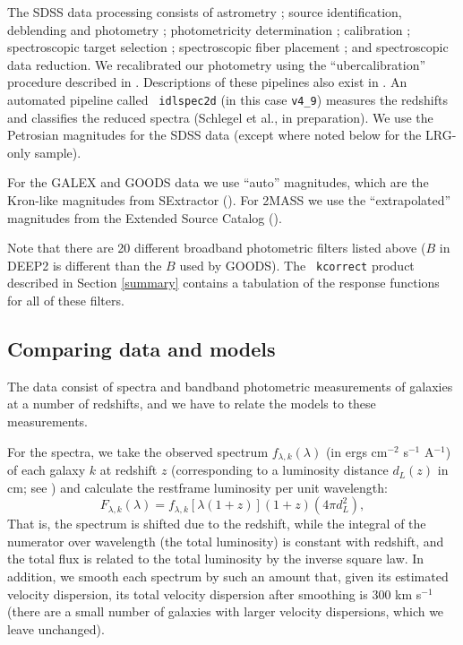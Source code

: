 \documentclass[10pt,preprint]{aastex}
\renewcommand{\AA}{A}
\begin{document}
The SDSS data processing consists of astrometry \citep{pier03a};
source identification, deblending and photometry \citep{lupton01a};
photometricity determination \citep{hogg01a}; calibration
\citep{fukugita96a,smith02a}; spectroscopic target selection
\citep{eisenstein01a,strauss02a,richards02a}; spectroscopic fiber
placement \citep{blanton03a}; and spectroscopic data reduction.  We
recalibrated our photometry using the ``ubercalibration'' procedure
described in \citet{blanton05a}.  Descriptions of these pipelines also
exist in \citet{stoughton02a}.  An automated pipeline called {\tt
idlspec2d} (in this case {\tt v4\_9}) measures the redshifts and
classifies the reduced spectra (Schlegel et al., in preparation). We
use the Petrosian magnitudes for the SDSS data (except where noted
below for the LRG-only sample).

For the GALEX and GOODS data we use ``auto'' magnitudes, which are the
Kron-like magnitudes from SExtractor (\citealt{bertin96a}).  For 2MASS
we use the ``extrapolated'' magnitudes from the Extended Source
Catalog (\citealt{jarrett00a}).

Note that there are 20 different broadband photometric filters listed
above ($B$ in DEEP2 is different than the $B$ used by GOODS). The {\tt
kcorrect} product described in Section \ref{summary} contains a
tabulation of the response functions for all of these filters.

\subsection{Comparing data and models}

The data consist of spectra and bandband photometric measurements of
galaxies at a number of redshifts, and we have to relate the models to
these measurements.

For the spectra, we take the observed spectrum
$f_{\lambda,k}(\lambda)$ (in ergs cm$^{-2}$ s$^{-1}$ \AA$^{-1}$) of
each galaxy $k$ at redshift $z$ (corresponding to a luminosity
distance $d_L(z)$ in cm; see \citealt{hogg99a}) and calculate the
restframe luminosity per unit wavelength:
\begin{equation}
{{F}}_{\lambda, k}(\lambda) = 
{{f}}_{\lambda, k}[\lambda (1+z)](1+z) (4 \pi d_L^2),
\end{equation}
That is, the spectrum is shifted due to the redshift, while the
integral of the numerator over wavelength (the total luminosity) is
constant with redshift, and the total flux is related to the total
luminosity by the inverse square law.  In addition, we smooth each
spectrum by such an amount that, given its estimated velocity
dispersion, its total velocity dispersion after smoothing is 300 km
s$^{-1}$ (there are a small number of galaxies with larger velocity
dispersions, which we leave unchanged).
\end{document}
